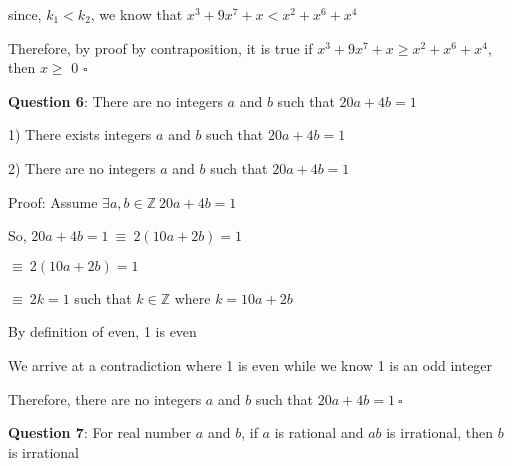 \documentclass{article} %
\newcommand{\question}[2][]{\begin{flushleft}
        \textbf{Question #1}: #2
\end{flushleft}}
\begin{document}
    since, $k_1 < k_2$, we know that $x^3 + 9x^7 + x < x^2+x^6+x^4$

    Therefore, by proof by contraposition, it is true if $x^3 + 9x^7 + x \geq x^2+x^6+x^4$, then $x \geq$ 0 $\square$

    \newpage

                                                                   

    \question[6]{There are no integers $a$ and $b$ such that $20a + 4b = 1$}

    1) There exists integers $a$ and $b$ such that $20a + 4b = 1$

    2) There are no integers $a$ and $b$ such that $20a + 4b = 1$

    \vspace*{0.3cm}

    Proof: Assume $\exists a, b \in \mathbb{Z}\ 20a + 4b = 1$

    So, $20a + 4b = 1\ \equiv\ 2(10a + 2b) = 1$

    \tabto{3.26cm}$\equiv\ 2(10a + 2b) = 1$

    \tabto{3.26cm}$\equiv\ 2k = 1$ such that $k \in \mathbb{Z}$ where $k = 10a + 2b$

    By definition of even, 1 is even

    We arrive at a contradiction where 1 is even while we know 1 is an odd integer

    Therefore, there are no integers $a$ and $b$ such that $20a + 4b = 1\ \square$ 



                                                                   

    \question[7]{For real number $a$ and $b$, if $a$ is rational and $ab$ is irrational, then $b$ is irrational}
\end{document}
